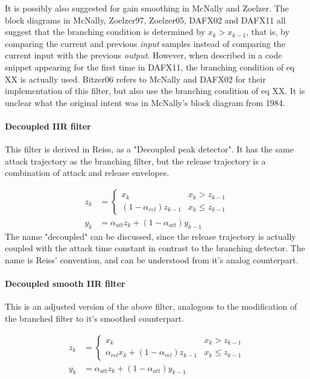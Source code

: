 \documentclass[../main2.tex]{subfiles}
\begin{document}
It is possibly also suggested for gain smoothing in McNally and Zoelzer. The block diagrams in McNally, Zoelzer97, Zoelzer05, DAFX02 and DAFX11 all suggest that the branching condition is determined by $x_k > x_{k-1}$, that is, by comparing the current and previous \emph{input} samples instead of comparing the current input with the previous \emph{output}. However, when described in a code snippet appearing for the first time in DAFX11, the branching condition of eq XX is actually used. Bitzer06 refers to McNally and DAFX02 for their implementation of this filter, but also use the branching condition of eq XX. It is unclear what the original intent was in McNally's block diagram from 1984.

\paragraph{Decoupled IIR filter}
This filter is derived in Reiss, as a "Decoupled peak detector". It has the same attack trajectory as the branching filter, but the release trajectory is a combination of attack and release envelopes.

\begin{equation}
\begin{split}
z_k &= \begin{cases}
    x_k 								& x_k > z_{k-1} \\
   (1-\alpha_{rel}) z_{k-1} 					& x_k \leq z_{k-1}
\end{cases} \\
y_k &= \alpha_{att} z_k + (1-\alpha_{att}) y_{k-1}
\end{split}
\end{equation}
The name "decoupled" can be discussed, since the release trajectory is actually coupled with the attack time constant in contrast to the branching detector. The name is Reiss' convention, and can be understood from it's analog counterpart.

\paragraph{Decoupled smooth IIR filter}
This is an adjusted version of the above filter, analogous to the modification of the branched filter to it's smoothed counterpart.

\begin{equation}
\begin{split}
z_k &= \begin{cases}
    x_k 								& x_k > z_{k-1} \\
    \alpha_{rel} x_k + (1-\alpha_{rel}) z_{k-1} 	& x_k \leq z_{k-1}
\end{cases} \\
y_k &= \alpha_{att} z_k + (1-\alpha_{att}) y_{k-1}
\end{split}
\end{equation}
\end{document}
